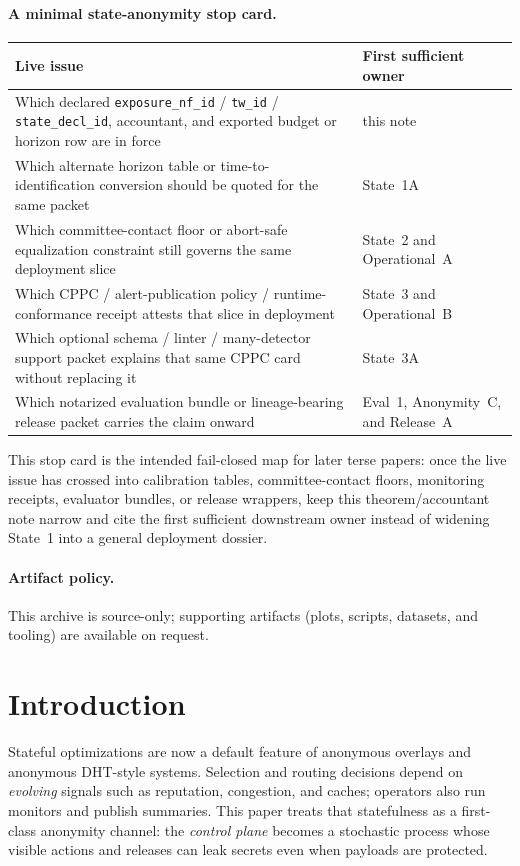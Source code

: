 \documentclass[11pt]{article}
\begin{document}
\paragraph{A minimal state-anonymity stop card.}
\begin{center}\small
\begin{tabular}{@{}L{3.5cm}L{7.9cm}@{}}
\toprule
\textbf{Live issue} & \textbf{First sufficient owner}\\
\midrule
Which declared \texttt{exposure\_nf\_id} / \texttt{tw\_id} / \texttt{state\_decl\_id}, accountant, and exported budget or horizon row are in force & this note\\
Which alternate horizon table or time-to-identification conversion should be quoted for the same packet & State~1A\\
Which committee-contact floor or abort-safe equalization constraint still governs the same deployment slice & State~2 and Operational~A\\
Which CPPC / alert-publication policy / runtime-conformance receipt attests that slice in deployment & State~3 and Operational~B\\
Which optional schema / linter / many-detector support packet explains that same CPPC card without replacing it & State~3A\\
Which notarized evaluation bundle or lineage-bearing release packet carries the claim onward & Eval~1, Anonymity~C, and Release~A\\
\bottomrule
\end{tabular}
\end{center}
This stop card is the intended fail-closed map for later terse papers: once the live issue has crossed into calibration tables, committee-contact floors, monitoring receipts, evaluator bundles, or release wrappers, keep this theorem/accountant note narrow and cite the first sufficient downstream owner instead of widening State~1 into a general deployment dossier.\cite{series:state1addendum,series:state2,series:operationalA,series:state3,series:operationalB,series:evalnotary,series:abomoinl,series:release}

\paragraph{Artifact policy.}
This archive is source-only; supporting artifacts (plots, scripts, datasets, and tooling) are available on request.\cite{series:artifactpolicy}



\section{Introduction}
Stateful optimizations are now a default feature of anonymous overlays and anonymous DHT-style systems.
Selection and routing decisions depend on \emph{evolving} signals such as reputation, congestion, and caches;
operators also run monitors and publish summaries.
This paper treats that statefulness as a first-class anonymity channel: the \emph{control plane} becomes a stochastic process whose visible actions and releases can leak secrets even when payloads are protected.
\end{document}
